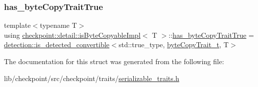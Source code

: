 \mbox{\label{structcheckpoint_1_1detail_1_1is_byte_copyable_impl_a2370db16994d2162a2806de74f322978}} 
\subsubsection{\texorpdfstring{has\+\_\+byte\+Copy\+Trait\+True}{has\_byteCopyTraitTrue}}
{\footnotesize\ttfamily template$<$typename T$>$ \\
using \hyperlink{structcheckpoint_1_1detail_1_1is_byte_copyable_impl}{checkpoint\+::detail\+::is\+Byte\+Copyable\+Impl}$<$ T $>$\+::\hyperlink{structcheckpoint_1_1detail_1_1is_byte_copyable_impl_a2370db16994d2162a2806de74f322978}{has\+\_\+byte\+Copy\+Trait\+True} =  \hyperlink{namespacedetection_afb970b23e39cfecb33449d40242c49ff}{detection\+::is\+\_\+detected\+\_\+convertible}$<$std\+::true\+\_\+type, \hyperlink{structcheckpoint_1_1detail_1_1is_byte_copyable_impl_a5ac4b9b4645bc6cfb4e68877719de938}{byte\+Copy\+Trait\+\_\+t}, T$>$}



The documentation for this struct was generated from the following file\+:\begin{DoxyCompactItemize}
\item 
lib/checkpoint/src/checkpoint/traits/\hyperlink{serializable__traits_8h}{serializable\+\_\+traits.\+h}\end{DoxyCompactItemize}
